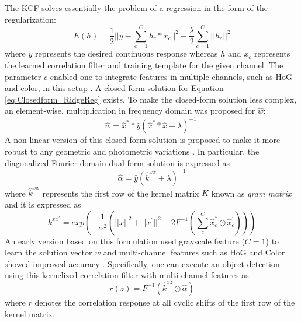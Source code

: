 \documentclass[10pt,twocolumn,letterpaper]{article}
\begin{document}
The KCF solves essentially the problem of a regression in the form of
the regularization:
\begin{equation}
E(h) = \frac{1}{2}||y-\sum_{c=1}^{C}h_{c}*x_{c}||^{2} + \frac{\lambda}{2}\sum_{c=1}^{C}||h_{c}||^{2}
\label{eq:Closedform_RidgeReg}
\end{equation}
where $y$ represents the desired continuous response whereas $h$ and
$x_{c}$ represents the learned correlation filter and training
template for the given channel. The parameter $c$ enabled one to
integrate features in multiple channels, such as HoG and color, in
this setup \cite{henriques2015high,galoogahi2013multi}. A closed-form
solution for Equation \ref{eq:Closedform_RidgeReg} exists. To make the
closed-form solution less complex, an element-wise, multiplication in
frequency domain was proposed for $\hat{w}$:
\begin{equation}
\hat{w} = \hat{x}^{*}*\hat{y}(\hat{x}^{*}*\hat{x}+\lambda)^{-1}.
\label{eq:DiagonalizedPrimalSolution}
\end{equation}
A non-linear version of this closed-form solution is proposed to make
it more robust to any geometric and photometric variations
\cite{henriques2015high}. In particular, the diagonalized Fourier
domain dual form solution is expressed as
\begin{equation}
\hat{\alpha} = \hat{y}(\hat{k}^{xx}+\lambda)^{-1}
\label{eq:FourierDualDomainSolution}
\end{equation}
where $\hat{k}^{xx}$ represents the first row of the kernel matrix $K$
known as \textit{gram matrix} and it is expressed as
\begin{equation}
k^{xx^{'}} = exp(-\dfrac{1}{\alpha^{2}}(||x||^{2}+||x^{'}||^{2}-2F^{-1}(\sum^{C}_{c}\hat{x}_{c}^{*}\odot \hat{x}_{c}^{'})))
\label{eq:GaussianCorrelationSingleChannel}
\end{equation}
An early version based on this formulation used grayscale feature
($C=1$) to learn the solution vector $w$ and multi-channel features
such as HoG and Color showed improved accuracy
\cite{henriques2015high,galoogahi2013multi,tang2015multi,ma2015long,bibi2015multi}. Specifically,
one can execute an object detection using this kernelized correlation
filter with multi-channel features as 
\begin{equation}
r(z) = F^{-1}(\hat{k}^{xz} \odot \hat{\alpha})
\end{equation}
where $r$ denotes the correlation response at all cyclic shifts of the
first row of the kernel matrix.
\end{document}

